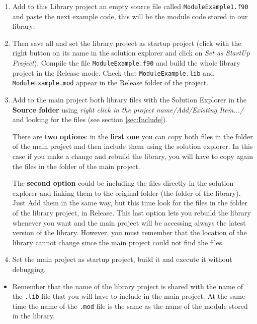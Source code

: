 \begin{enumerate}
\begin{enumerate}
		\item Add to this Library project an empty source file called \texttt{ModuleExample1.f90} and paste the next example code, this will be the module code stored in our library:	
        
        \vspace{0.5cm}
        		
		
		\item Then save all and set the library project as startup project (click with the right button on its name in the solution explorer and click on \textit{Set as StartUp Project}). Compile the file \texttt{ModuleExample.f90} and build the whole library project in the Release mode. Check that \texttt{ModuleExample.lib} and \texttt{ModuleExample.mod} appear in the Release folder of the project.
        
		\item Add to the main project both library files with the Solution Explorer in the \textbf{Source folder} using \textit{right click in the project name/Add/Existing Item.../} and looking for the files (see section \ref{sec:Include}).
        
        There are \textbf{two options}: in the \textbf{first one} you can copy both files in the folder of the main project and then include them using the solution explorer. In this case if you make a change and rebuild the library, you will have to copy again the files in the folder of the main project.
        
        The \textbf{second option} could be including the files directly in the solution explorer and linking them to the original folder (the folder of the library). Just Add them in the same way, but this time look for the files in the folder of the library project, in Release. This last option lets you rebuild the library whenever you want and the main project will be accessing always the latest version of the library. However, you must remember that the location of the library cannot change since the main project could not find the files. 

		\item Set the main project as startup project, build it and execute it without debugging. 
        
	\end{enumerate}
	
    \begin{IN}
        \begin{itemize}
            \item Remember that the name of the library project is shared with the name of the \texttt{.lib} file that you will have to include in the main project. At the same time the name of the \texttt{.mod} file is the same as the name of the module stored in the library. 
            

\end{itemize}
\end{IN}
\end{enumerate}
